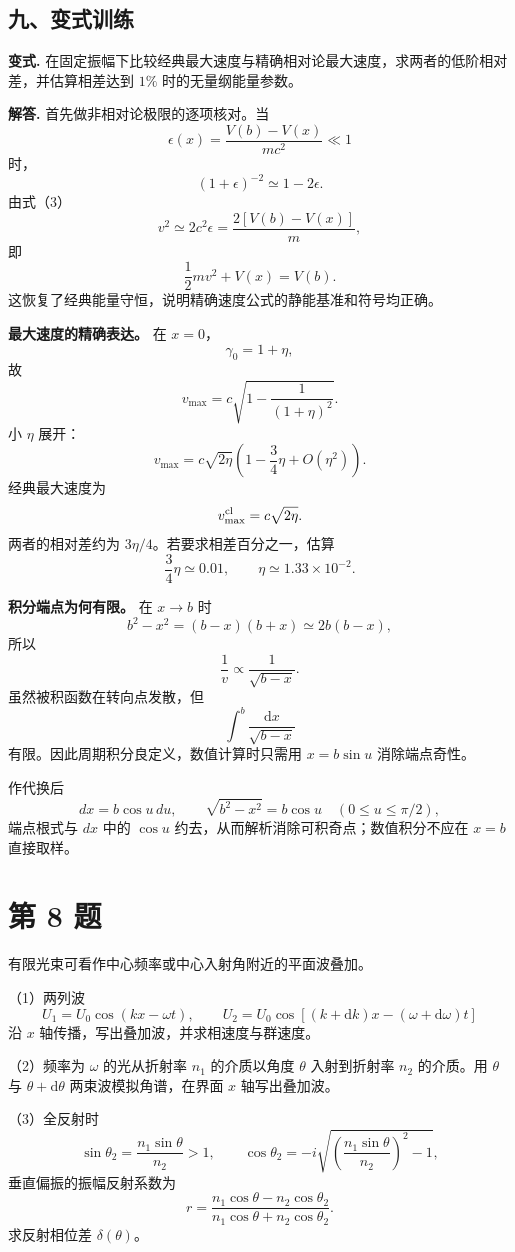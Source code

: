\documentclass[12pt,a4paper,UTF8]{ctexart}
\begin{document}
\subsection{九、变式训练}\label{ux4e5dux53d8ux5f0fux8badux7ec3-6}

\textbf{变式.}
在固定振幅下比较经典最大速度与精确相对论最大速度，求两者的低阶相对差，并估算相差达到
\(1\%\) 时的无量纲能量参数。

\textbf{解答.} 首先做非相对论极限的逐项核对。当 \[
\epsilon(x)=\frac{V(b)-V(x)}{mc^2}\ll1
\] 时， \[
\left(1+\epsilon\right)^{-2}
\simeq1-2\epsilon.
\] 由式（3） \[
v^2\simeq2c^2\epsilon
=\frac{2[V(b)-V(x)]}{m},
\] 即 \[
\frac12mv^2+V(x)=V(b).
\] 这恢复了经典能量守恒，说明精确速度公式的静能基准和符号均正确。

\textbf{最大速度的精确表达。} 在 \(x=0\)， \[
\gamma_0=1+\eta,
\] 故 \[
v_{\max}
=c\sqrt{1-\frac1{(1+\eta)^2}}.
\] 小 \(\eta\) 展开： \[
v_{\max}
=c\sqrt{2\eta}
\left(1-\frac34\eta+O(\eta^2)\right).
\] 经典最大速度为 \[
v_{\max}^{\rm cl}=c\sqrt{2\eta}.
\] 两者的相对差约为 \(3\eta/4\)。若要求相差百分之一，估算 \[
\frac34\eta\simeq0.01,
\qquad
\eta\simeq1.33\times10^{-2}.
\]

\textbf{积分端点为何有限。} 在 \(x\to b\) 时 \[
b^2-x^2=(b-x)(b+x)\simeq2b(b-x),
\] 所以 \[
\frac1v\propto\frac1{\sqrt{b-x}}.
\] 虽然被积函数在转向点发散，但 \[
\int^{b}\frac{\mathrm dx}{\sqrt{b-x}}
\] 有限。因此周期积分良定义，数值计算时只需用 \(x=b\sin u\)
消除端点奇性。

作代换后 \[
dx=b\cos u\,du,
\qquad
\sqrt{b^2-x^2}=b\cos u
\quad(0\le u\le\pi/2),
\] 端点根式与 \(dx\) 中的 \(\cos u\)
约去，从而解析消除可积奇点；数值积分不应在 \(x=b\) 直接取样。

\newpage

\section{第 8 题}\label{ux7b2c-8-ux9898}

有限光束可看作中心频率或中心入射角附近的平面波叠加。

（1）两列波 \[
U_1=U_0\cos(kx-\omega t),\qquad
U_2=U_0\cos[(k+\mathrm dk)x-(\omega+\mathrm d\omega)t]
\] 沿 \(x\) 轴传播，写出叠加波，并求相速度与群速度。

（2）频率为 \(\omega\) 的光从折射率 \(n_1\) 的介质以角度 \(\theta\)
入射到折射率 \(n_2\) 的介质。用 \(\theta\) 与 \(\theta+\mathrm d\theta\)
两束波模拟角谱，在界面 \(x\) 轴写出叠加波。

（3）全反射时 \[
\sin\theta_2=\frac{n_1\sin\theta}{n_2}>1,\qquad
\cos\theta_2=-i\sqrt{\left(\frac{n_1\sin\theta}{n_2}\right)^2-1},
\] 垂直偏振的振幅反射系数为 \[
r=\frac{n_1\cos\theta-n_2\cos\theta_2}
{n_1\cos\theta+n_2\cos\theta_2}.
\] 求反射相位差 \(\delta(\theta)\)。
\end{document}
